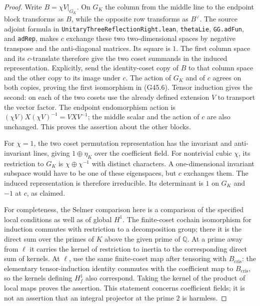 \begin{proof}
Write $B=\chi V|_{G_K}$.  On $G_K$ the column from the
middle line to the endpoint block transforms as $B$, while
the opposite row transforms as $B^\vee$.  The source adjoint
formula in \texttt{UnitaryThreeReflectionRight.lean},
\texttt{thetaLie}, \texttt{GG.adFun}, and \texttt{adRep},
makes $c$ exchange these two two-dimensional spaces by negative
transpose and the anti-diagonal matrices.  Its square is $1$.
The first column space and its $c$-translate therefore give the
two coset summands in the induced representation.  Explicitly,
send the identity-coset copy of $B$ to that column space and
the other copy to its image under $c$.  The action of $G_K$
and of $c$ agrees on both copies, proving the first isomorphism
in (G45.6).  Tensor induction gives the second: on each of the
two cosets use the already defined extension $V$ to transport
the vector factor.  The endpoint endomorphism action is
$(\chi V)X(\chi V)^{-1}=VXV^{-1}$; the middle scalar and
the action of $c$ are also unchanged.  This proves the assertion
about the other blocks.

For $\chi=1$, the two coset permutation representation has
the invariant and anti-invariant lines, giving $1\oplus\eta_K$
over the coefficient field.  For nontrivial cubic $\chi$, its
restriction to $G_K$ is $\chi\oplus\chi^{-1}$ with distinct
characters.  A one-dimensional invariant subspace would have
to be one of these eigenspaces, but $c$ exchanges them.
The induced representation is therefore irreducible.  Its
determinant is $1$ on $G_K$ and $-1$ at $c$, as claimed.

For completeness, the Selmer comparison here is a comparison
of the specified local conditions as well as of global $H^1$.
The finite-coset cochain isomorphism for induction commutes
with restriction to a decomposition group; there it is the
direct sum over the primes of $K$ above the given prime of
$\mathbb Q$.  At a prime away from $\ell$ it carries the
kernel of restriction to inertia to the corresponding direct
sum of kernels.  At $\ell$, use the same finite-coset map
after tensoring with $B_{\mathrm{cris}}$: the elementary
tensor-induction identity commutes with the coefficient map
to $B_{\mathrm{cris}}$, so the kernels defining $H^1_f$ also
correspond.  Taking the kernel of the product of local maps
proves the assertion.  This statement concerns coefficient
fields; it is not an assertion that an integral projector at
the prime $2$ is harmless.


\end{proof}
